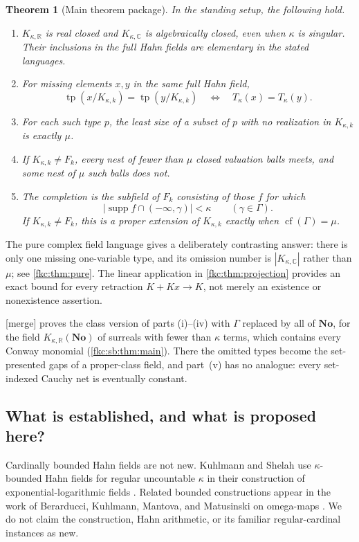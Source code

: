 \documentclass[11pt,letterpaper]{article}
\numberwithin{equation}{section}
\newtheorem{theorem}{Theorem}[section]
\theoremstyle{definition}
\theoremstyle{remark}
\newcommand{\R}{\mathbb R}
\newcommand{\C}{\mathbb C}
\newcommand{\No}{\mathbf{No}}
\newcommand{\supp}{\operatorname{supp}}
\newcommand{\cf}{\operatorname{cf}}
\newcommand{\tp}{\operatorname{tp}}
\newcommand{\mergetag}{\textup{\textsf{\small[merge]}}}%
\newcommand{\KN}[2]{K_{#1,#2}(\No)}%
\begin{document}
\begin{theorem}[Main theorem package]\label{fkc:thm:main}
In the standing setup, the following hold.
\begin{enumerate}[label=\textup{(\roman*)}]
\item $K_{\kappa,\R}$ is real closed and $K_{\kappa,\C}$ is algebraically closed, even when $\kappa$ is singular. Their inclusions in the full Hahn fields are elementary in the stated languages.
\item For missing elements $x,y$ in the same full Hahn field,
\[
 \tp(x/K_{\kappa,k})=\tp(y/K_{\kappa,k})
 \quad\Longleftrightarrow\quad T_\kappa(x)=T_\kappa(y).
\]
\item For each such type $p$, the least size of a subset of $p$ with no realization in $K_{\kappa,k}$ is exactly $\mu$.
\item If $K_{\kappa,k}\ne F_k$, every nest of fewer than $\mu$ closed valuation balls meets, and some nest of $\mu$ such balls does not.
\item The completion is the subfield of $F_k$ consisting of those $f$ for which
\[
 |\supp f\cap(-\infty,\gamma)|<\kappa\qquad(\gamma\in\Gamma).
\]
If $K_{\kappa,k}\ne F_k$, this is a proper extension of $K_{\kappa,k}$ exactly when $\cf(\Gamma)=\mu$.
\end{enumerate}
\end{theorem}

The pure complex field language gives a deliberately contrasting answer: there is only one missing one-variable type, and its omission number is $|K_{\kappa,\C}|$ rather than $\mu$; see \cref{fkc:thm:pure}. The linear application in \cref{fkc:thm:projection} provides an exact bound for every retraction $K+Kx\to K$, not merely an existence or nonexistence assertion.

\mergetag{}  proves the class version of parts (i)--(iv) with $\Gamma$ replaced by all of $\No$, for the field $\KN\kappa\R$ of surreals with fewer than $\kappa$ terms, which contains every Conway monomial (\cref{fkc:sb:thm:main}). There the omitted types become the set-presented gaps of a proper-class field, and part~(v) has no analogue: every set-indexed Cauchy net is eventually constant.

\subsection{What is established, and what is proposed here?}
Cardinally bounded Hahn fields are not new. Kuhlmann and Shelah use $\kappa$-bounded Hahn fields for regular uncountable $\kappa$ in their construction of exponential-logarithmic fields \cite{KS}. Related bounded constructions appear in the work of Berarducci, Kuhlmann, Mantova, and Matusinski on omega-maps \cite{BKMM}. We do not claim the construction, Hahn arithmetic, or its familiar regular-cardinal instances as new.
\end{document}

